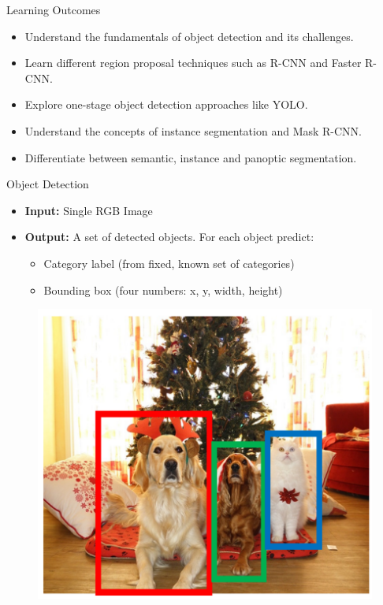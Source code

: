 \documentclass[10pt]{beamer}
\theoremstyle{remark}
\theoremstyle{definition}
\begin{document}
\begin{frame}{Learning Outcomes}
\begin{itemize}
    \item Understand the fundamentals of object detection and its challenges.
    \item Learn different region proposal techniques such as R-CNN and Faster R-CNN.
    \item Explore one-stage object detection approaches like YOLO.
    \item Understand the concepts of instance segmentation and Mask R-CNN.
    \item Differentiate between semantic, instance and panoptic segmentation.
\end{itemize}
\end{frame}

\begin{frame}[allowframebreaks]{Object Detection}
\begin{itemize}
    \item \textbf{Input:} Single RGB Image
    \item \textbf{Output:} A set of detected objects. For each object predict:
    \begin{itemize}
        \item Category label (from fixed, known set of categories)
        \item Bounding box (four numbers: x, y, width, height)

    \end{itemize}
    
\end{itemize}

\framebreak

\begin{figure}
\centering
\includegraphics[width=1.0\textwidth,height=0.95\textheight,keepaspectratio]{./images/object_1.png}
\end{figure}
    
\end{frame}
\end{document}
